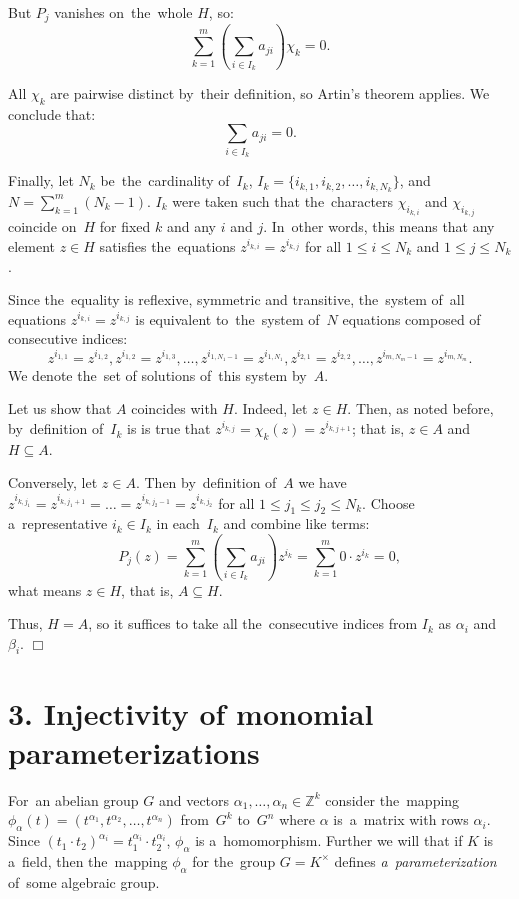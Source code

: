 \documentclass[twoside]{article}
\begin{document}
    But $P_j$ vanishes on~the~whole $H$, so:
    $$
        \sum_{k = 1}^{m} \left( \sum_{i \in I_k} a_{ji} \right) \chi_k = 0.
    $$

    All $\chi_k$ are pairwise distinct by~their definition, so Artin's theorem applies. We conclude that:
    $$
    \sum_{i \in I_k} a_{ji} = 0.
    $$

    Finally, let $N_k$ be~the~cardinality of~$I_k$, $I_k = \{i_{k, 1}, i_{k, 2}, \ldots, i_{k, N_k}\}$, and $N = \sum_{k = 1}^m (N_k - 1)$.
    $I_k$ were taken such that the~characters $\chi_{i_{k, i}}$ and $\chi_{i_{k, j}}$ coincide on~$H$ for fixed $k$ and any $i$ and $j$.
    In~other words, this means that any element $z \in H$ satisfies the~equations $z^{i_{k, i}} = z^{i_{k, j}}$ for all $1 \leq i \leq N_k$
    and $1 \leq j \leq N_k$.

    Since the~equality is reflexive, symmetric and transitive, the~system of~all equations $z^{i_{k, i}} = z^{i_{k, j}}$
    is equivalent to~the~system of~$N$ equations composed of consecutive indices:
    $$
        z^{i_{1, 1}} = z^{i_{1, 2}}, z^{i_{1, 2}} = z^{i_{1, 3}}, \ldots, z^{i_{1, N_1 - 1}} = z^{i_{1, N_1}}, z^{i_{2, 1}} = z^{i_{2, 2}}, \ldots, z^{i_{m, N_m - 1}} = z^{i_{m, N_m}}.
    $$
    We denote the~set of solutions of~this system by~$A$.

    Let us show that $A$ coincides with $H$. Indeed, let $z \in H$. Then, as noted before,
    by~definition of~$I_k$ is is true that $z^{i_{k, j}} = \chi_k(z) = z^{i_{k, j + 1}}$;
    that is, $z \in A$ and $H \subseteq A$.

    Conversely, let $z \in A$. Then by~definition of~$A$ we have $z^{i_{k, j_1}} = z^{i_{k, j_1 + 1}} = \ldots = z^{i_{k, j_2 - 1}} = z^{i_{k, j_2}}$
    for all $1 \leq j_1 \leq j_2 \leq N_k$. Choose a~representative $i_k \in I_k$ in each~$I_k$
    and combine like terms:
    $$
        P_j(z) = \sum_{k = 1}^{m} \left( \sum_{i \in I_k} a_{ji} \right) z^{i_k} = \sum_{k = 1}^{m} 0 \cdot z^{i_k} = 0,
    $$
    what means $z \in H$, that is, $A \subseteq H$.

    Thus, $H = A$, so it suffices to take all the~consecutive indices from $I_k$ as $\alpha_i$ and $\beta_i$.
\hfill$\Box$\medskip

\section*{3. Injectivity of monomial parameterizations}

For~an abelian group $G$ and vectors $\alpha_1, \ldots, \alpha_n \in \mathbb{Z}^k$ consider the~mapping
$\phi_\alpha(t) = (t^{\alpha_1}, t^{\alpha_2}, \ldots, t^{\alpha_n})$ from~$G^k$ to~$G^n$ where $\alpha$ is~a~matrix
with rows $\alpha_i$. Since $(t_1 \cdot t_2)^{\alpha_i} = t_1^{\alpha_i} \cdot t_2^{\alpha_i}$,
$\phi_\alpha$ is a~homomorphism. Further we will that if $K$ is a~field, then the~mapping $\phi_\alpha$
for the~group $G = K^\times$ defines \textit{a~parameterization} of~some algebraic group.
\end{document}

